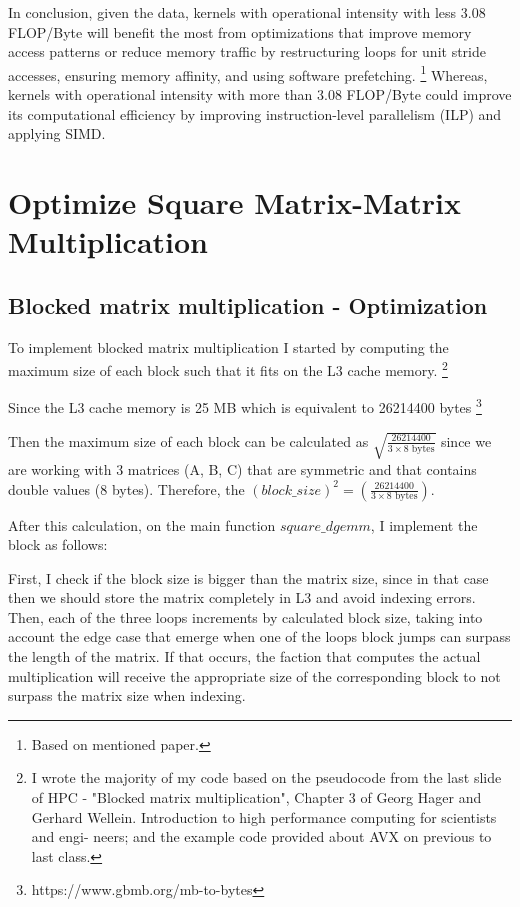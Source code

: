 \documentclass[unicode,11pt,a4paper,oneside,numbers=endperiod,openany]{scrartcl}
\begin{document}
In conclusion, given the data, kernels with operational intensity with less 3.08 FLOP/Byte will benefit the most from optimizations that improve memory access patterns or reduce memory traffic by 
restructuring loops for unit stride accesses, ensuring memory affinity, and using software prefetching. \footnote{Based on mentioned paper.}
Whereas, kernels with operational intensity with more than 3.08 FLOP/Byte could improve its computational efficiency by improving instruction-level parallelism (ILP) and applying SIMD.

\section{Optimize Square Matrix-Matrix Multiplication  }
\subsection{Blocked matrix multiplication - Optimization}
To implement blocked matrix multiplication I started by computing the maximum size of each block such that it fits on the L3 cache memory. 
\footnote{I wrote the majority of my code based on the pseudocode from the last slide of HPC - "Blocked matrix multiplication", Chapter 3 of Georg Hager and Gerhard Wellein. Introduction to high performance computing for scientists and engi-
neers; and the example code provided about AVX on previous to last class.}

Since the L3 cache memory is 25 MB which is equivalent to 26214400 bytes \footnote{https://www.gbmb.org/mb-to-bytes}

Then the maximum size of each block can be calculated as $\sqrt{\frac{26214400}{3 \times 8 \text{ bytes}}}$ 
since we are working with 3 matrices (A, B, C) that are symmetric and that contains double values (8 bytes).
Therefore, the $(block\_size)^2 = (\frac{26214400}{3 \times 8 \text{ bytes}})$.

After this calculation, on the main function $square\_dgemm$, I implement the block as follows: 

First, I check if the block size is bigger than the matrix size, since in that case then we should store the matrix completely in L3 
and avoid indexing errors. Then, each of the three loops increments by calculated block size, taking into account the edge case that emerge when one of 
the loops block jumps can surpass the length of the matrix. If that occurs, the faction that computes the actual multiplication will receive the appropriate size 
of the corresponding block to not surpass the matrix size when indexing. 
\end{document}
